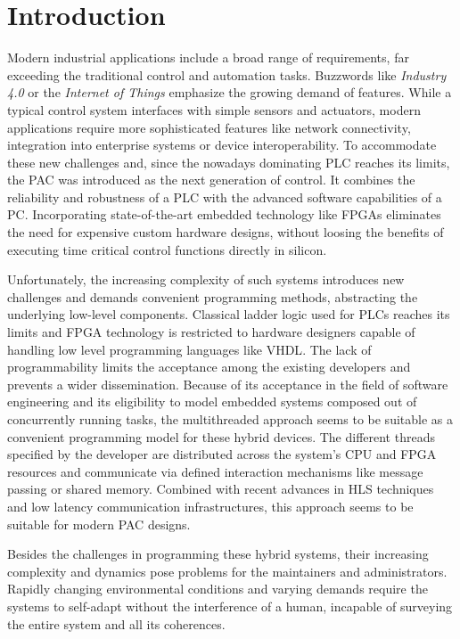 \chapter{Introduction}

Modern industrial applications include a broad range of requirements, far
exceeding the traditional control and automation tasks. Buzzwords like
\emph{Industry 4.0} or the \emph{Internet of Things} emphasize the growing
demand of features. While a typical control system interfaces with simple
sensors and actuators, modern applications require more sophisticated features
like network connectivity, integration into enterprise systems or device
interoperability. To accommodate these new challenges and, since the nowadays
dominating \ac{PLC} reaches its limits, the \ac{PAC} was introduced as the
next generation of control. It combines the reliability and robustness of a
\ac{PLC} with the advanced software capabilities of a \ac{PC}. Incorporating
state-of-the-art embedded technology like \acp{FPGA} eliminates the need for
expensive custom hardware designs, without loosing the benefits of executing
time critical control functions directly in silicon.

Unfortunately, the increasing complexity of such systems introduces new
challenges and demands convenient programming methods, abstracting the
underlying low-level components. Classical ladder logic used for \acp{PLC}
reaches its limits and \ac{FPGA} technology is restricted to hardware
designers capable of handling low level programming languages like \ac{VHDL}.
The lack of programmability limits the acceptance among the existing
developers and prevents a wider dissemination. Because of its acceptance in
the field of software engineering and its eligibility to model embedded
systems composed out of concurrently running tasks, the multithreaded approach
seems to be suitable as a convenient programming model for these hybrid
devices. The different threads specified by the developer are distributed
across the system's \ac{CPU} and \ac{FPGA} resources and communicate via
defined interaction mechanisms like message passing or shared memory. Combined
with recent advances in \ac{HLS} techniques and low latency communication
infrastructures, this approach seems to be suitable for modern \ac{PAC}
designs.

Besides the challenges in programming these hybrid systems, their increasing
complexity and dynamics pose problems for the maintainers and administrators.
Rapidly changing environmental conditions and varying demands require the
systems to self-adapt without the interference of a human, incapable of
surveying the entire system and all its coherences.

